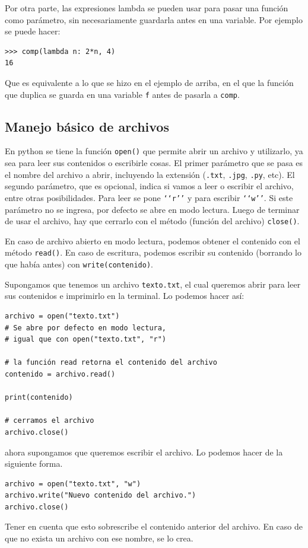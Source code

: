 \documentclass[a4paper, 12pt]{report}
\theoremstyle{definition}
\begin{document}
Por otra parte, las expresiones lambda se pueden usar para pasar una función como parámetro, sin necesariamente guardarla antes en una variable. Por ejemplo se puede hacer:
\begin{verbatim}
>>> comp(lambda n: 2*n, 4)
16
\end{verbatim}
Que es equivalente a lo que se hizo en el ejemplo de arriba, en el que la función que duplica se guarda en una variable {\tt f} antes de pasarla a {\tt comp}.

\subsection{Manejo básico de archivos}

En python se tiene la función {\tt open()} que permite abrir un archivo y utilizarlo, ya sea para leer sus contenidos o escribirle cosas. El primer parámetro que se pasa es el nombre del archivo a abrir, incluyendo la extensión ({\tt .txt}, {\tt .jpg}, {\tt .py}, etc). El segundo parámetro, que es opcional, indica si vamos a leer o escribir el archivo, entre otras posibilidades. Para leer se pone {\tt \lq\lq r\rq\rq} y para escribir {\tt\lq\lq w\rq\rq}. Si este parámetro no se ingresa, por defecto se abre en modo lectura. Luego de terminar de usar el archivo, hay que cerrarlo con el método (función del archivo) {\tt close()}.

En caso de archivo abierto en modo lectura, podemos obtener el contenido con el método {\tt read()}. En caso de escritura, podemos escribir su contenido (borrando lo que había antes) con {\tt write(contenido)}.

Supongamos que tenemos un archivo {\tt texto.txt}, el cual queremos abrir para leer sus contenidos e imprimirlo en la terminal. Lo podemos hacer así:
\begin{verbatim}
archivo = open("texto.txt")
# Se abre por defecto en modo lectura,
# igual que con open("texto.txt", "r")

# la función read retorna el contenido del archivo
contenido = archivo.read()

print(contenido)

# cerramos el archivo
archivo.close()
\end{verbatim}

ahora supongamos que queremos escribir el archivo. Lo podemos hacer de la siguiente forma.
\begin{verbatim}
archivo = open("texto.txt", "w")
archivo.write("Nuevo contenido del archivo.")
archivo.close()
\end{verbatim}
Tener en cuenta que esto sobrescribe el contenido anterior del archivo. En caso de que no exista un archivo con ese nombre, se lo crea.
\end{document}
